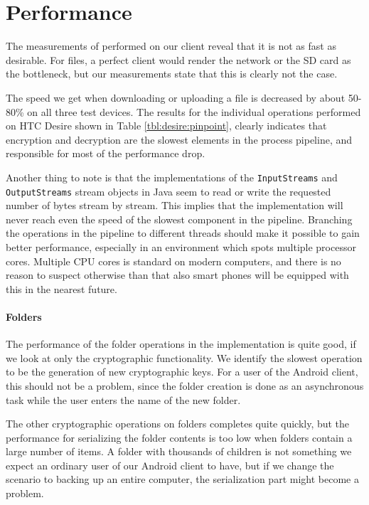 \documentclass[pdftex,english,10pt,b5paper,twoside]{book}
\begin{document}
\section{Performance}

The measurements of performed on our client reveal that it is not as fast as
desirable. For files, a perfect client would render the network or the SD card
as the bottleneck, but our measurements state that this is clearly not the
case. 

The speed we get when downloading or uploading a file is decreased by about
50-80\% on all three test devices. The results for the individual operations
performed on HTC Desire shown in Table \ref{tbl:desire:pinpoint}, clearly
indicates that encryption and decryption are the slowest elements in the
process pipeline, and responsible for most of the performance drop. 

Another thing to note is that the implementations of the \texttt{InputStreams}
and \texttt{OutputStreams} stream objects in Java seem to read or write the
requested number of bytes stream by stream. This implies that the
implementation will never reach even the speed of the slowest component in the
pipeline. Branching the operations in the pipeline to different threads should
make it possible to gain better performance, especially in an environment
which spots multiple processor cores. Multiple \ac{CPU} cores is standard on
modern computers, and there is no reason to suspect otherwise than that also
smart phones will be equipped with this in the nearest future.

\paragraph{Folders} The performance of the folder operations in the
implementation is quite good, if we look at only the cryptographic
functionality. We identify the slowest operation to be the generation of
new cryptographic keys. For a user of the Android client, this should not be a
problem, since the folder creation is done as an asynchronous task while the
user enters the name of the new folder.

The other cryptographic operations on folders completes quite quickly, but the
performance for serializing the folder contents is too low when folders contain
a large number of items. A folder with thousands of children is not
something we expect an ordinary user of our Android client to have, but if we
change the scenario to backing up an entire computer, the serialization part
might become a problem. 
\end{document}
